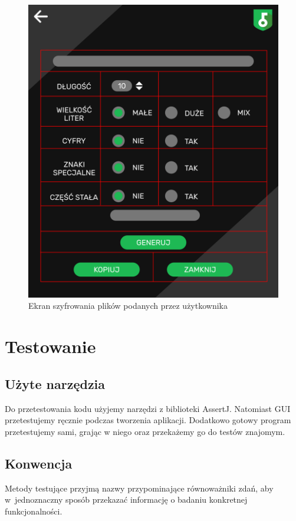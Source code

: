 \documentclass[a4paper]{article}
\begin{document}
\begin{figure}[H]
    \centering
    \includegraphics[width=1\textwidth]{img/ekran_generacji.png}
    \caption{Ekran szyfrowania plików podanych przez użytkownika}
    \label{fig:szyfrowanie}
\end{figure}



\section{Testowanie}
\subsection{Użyte narzędzia}
Do przetestowania kodu użyjemy narzędzi z biblioteki AssertJ. Natomiast GUI przetestujemy ręcznie podczas tworzenia aplikacji. Dodatkowo gotowy program przetestujemy sami, grając w niego oraz przekażemy go do testów znajomym.

\subsection{Konwencja}
Metody testujące przyjmą nazwy przypominające równoważniki zdań, aby w~jednoznaczny sposób przekazać informację o badaniu konkretnej funkcjonalności.
\end{document}
